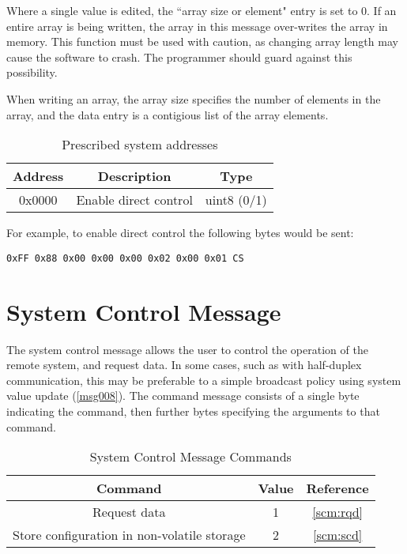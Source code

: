 Where a single value is edited, the ``array size or element" entry is set to 0. If an entire array is being written, the array in this message over-writes the array in memory. This function must be used with caution, as changing array length may cause the software to crash. The programmer should guard against this possibility.

When writing an array, the array size specifies the number of elements in the array, and the data entry is a contigious list of the array elements.

\begin{table}[H]
  \centering
  \begin{tabular}{ c c c }
  Address & Description & Type \\
\hline
  0x0000   & Enable direct control & uint8 (0/1) \\
  \end{tabular}
  \caption{Prescribed system addresses}
  \label{tab:svu:prescribed}
\end{table}

For example, to enable direct control the following bytes would be sent:
\begin{verbatim}
0xFF 0x88 0x00 0x00 0x00 0x02 0x00 0x01 CS
\end{verbatim}

\section{System Control Message}
\label{msg009}

The system control message allows the user to control the operation of the remote system, and request data. In some cases, such as with half-duplex communication, this may be preferable to a simple broadcast policy using system value update (\ref{msg008}). The command message consists of a single byte indicating the command, then further bytes specifying the arguments to that command.

\begin{table}[H]
  \centering
  \begin{tabular}{ c c c }
    Command              & Value & Reference \\
\hline
    Request data          & 1 & \ref{scm:rqd} \\
    Store configuration in non-volatile storage  & 2 & \ref{scm:scd}\\
  \end{tabular}
  \caption{System Control Message Commands}
  \label{tab:scm:commands}
\end{table}

